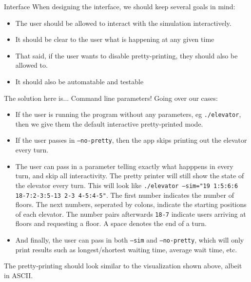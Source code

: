 \documentclass[10pt]{article}
\begin{document}
\begin{section}{Interface}
When designing the interface, we should keep several goals in mind:
  \begin{itemize}
    \item The user should be allowed to interact with the simulation interactively.
    \item It should be clear to the user what is happening at any given time
    \item That said, if the user wants to disable pretty-printing, they should also be allowed to.
    \item It should also be automatable and testable
  \end{itemize}
  The solution here is... Command line parameters! Going over our cases:
  \begin{itemize}
    \item If the user is running the program without any parameters, eg \texttt{./elevator}, then we give them the default interactive pretty-printed mode.
    \item If the user passes in \texttt{--no-pretty}, then the app skips printing out the elevator every turn.
    \item The user can pass in a parameter telling exactly what happpens in every turn, and skip all interactivity. The pretty printer will still show the state of the elevator every turn. This will look like \texttt{./elevator --sim="19 1:5:6:6 18-7:2-3:5-13 2-3 4-5:4-5"}. The first number indicates the number of floors. The next numbers, seperated by colons, indicate the starting positions of each elevator. The number pairs afterwards \texttt{18-7} indicate users arriving at floors and requesting a floor. A space denotes the end of a turn.
    \item And finally, the user can pass in both \texttt{--sim} and \texttt{--no-pretty}, which will only print results such as longest/shortest waiting time, average wait time, etc.
  \end{itemize}
  The pretty-printing should look similar to the visualization shown above, albeit in ASCII.
\end{section}
\end{document}
